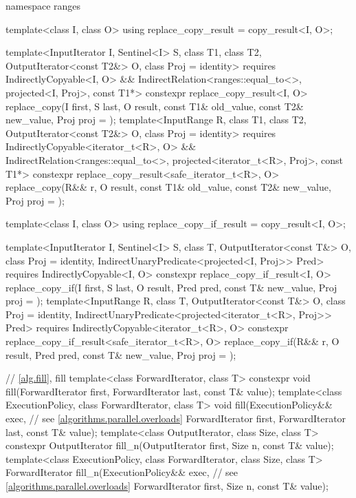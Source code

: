 \begin{codeblock}
{  namespace ranges {
    template<class I, class O>
    using replace_copy_result = copy_result<I, O>;

    template<InputIterator I, Sentinel<I> S, class T1, class T2, OutputIterator<const T2&> O,
             class Proj = identity>
      requires IndirectlyCopyable<I, O> &&
               IndirectRelation<ranges::equal_to<>, projected<I, Proj>, const T1*>
      constexpr replace_copy_result<I, O>
        replace_copy(I first, S last, O result, const T1& old_value, const T2& new_value,
                     Proj proj = {});
    template<InputRange R, class T1, class T2, OutputIterator<const T2&> O,
             class Proj = identity>
      requires IndirectlyCopyable<iterator_t<R>, O> &&
               IndirectRelation<ranges::equal_to<>, projected<iterator_t<R>, Proj>, const T1*>
      constexpr replace_copy_result<safe_iterator_t<R>, O>
        replace_copy(R&& r, O result, const T1& old_value, const T2& new_value,
                     Proj proj = {});

    template<class I, class O>
    using replace_copy_if_result = copy_result<I, O>;

    template<InputIterator I, Sentinel<I> S, class T, OutputIterator<const T&> O,
             class Proj = identity, IndirectUnaryPredicate<projected<I, Proj>> Pred>
      requires IndirectlyCopyable<I, O>
      constexpr replace_copy_if_result<I, O>
        replace_copy_if(I first, S last, O result, Pred pred, const T& new_value,
                        Proj proj = {});
    template<InputRange R, class T, OutputIterator<const T&> O, class Proj = identity,
             IndirectUnaryPredicate<projected<iterator_t<R>, Proj>> Pred>
      requires IndirectlyCopyable<iterator_t<R>, O>
      constexpr replace_copy_if_result<safe_iterator_t<R>, O>
        replace_copy_if(R&& r, O result, Pred pred, const T& new_value,
                        Proj proj = {});
  }

  // \ref{alg.fill}, fill
  template<class ForwardIterator, class T>
    constexpr void fill(ForwardIterator first, ForwardIterator last, const T& value);
  template<class ExecutionPolicy, class ForwardIterator, class T>
    void fill(ExecutionPolicy&& exec, // see \ref{algorithms.parallel.overloads}
              ForwardIterator first, ForwardIterator last, const T& value);
  template<class OutputIterator, class Size, class T>
    constexpr OutputIterator fill_n(OutputIterator first, Size n, const T& value);
  template<class ExecutionPolicy, class ForwardIterator,
           class Size, class T>
    ForwardIterator fill_n(ExecutionPolicy&& exec, // see \ref{algorithms.parallel.overloads}
                           ForwardIterator first, Size n, const T& value);

}
\end{codeblock}
